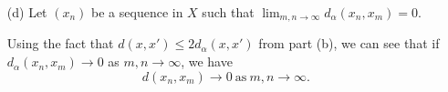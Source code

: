 \documentclass[a4paper]{article}
\begin{document}
\begin{enumerate}
        \( \lim_{ m,n \to \infty  }  {d}_{\alpha}({x}_{n}, {x}_{m}) = 0  \).
        \begin{proof}
        We claim that \( \lim_{ m,n  \to \infty  }  {d}_{\alpha}({x}_{n}, {x}_{m}) = 0  \) holds given \( \lim_{ m,n \to \infty  } d({x}_{n},{x}_{m}) = 0  \). Indeed, using the Algebraic Limit Theorem, we have
        \begin{align*}
            \lim_{ m,n  \to  \infty   }  {d}_{\alpha}({x}_{n}, {x}_{m}) &= \lim_{ m,n  \to  \infty   }  \Big[ \frac{ d({x}_{n}, {x}_{m}) }{  1 + \alpha d({x}_{n}, {x}_{m}) } \Big] \\
                                                                        &= \frac{ \lim_{ m,n \to  \to \infty  } d({x}_{n}, {x}_{m}) }{ 1 + \alpha \lim_{ m,n  \to \infty  }  d({x}_{n}, {x}_{m}) } \\
                                                                        &= \frac{  0  }{  1+ \alpha \cdot  0  }  \\
                                                                        &= 0.
        \end{align*}
        \end{proof}
    \item[(d)] Let \( ({x}_{n}) \) be a sequence in \( X  \) such that \( \lim_{ m,n  \to  \infty  }  {d}_{\alpha}({x}_{n}, {x}_{m}) = 0  \).
        \begin{solution}
        Using the fact that \( d(x,x') \leq 2 {d}_{\alpha}(x,x') \) from part (b), we can see that if \( {d}_{\alpha}({x}_{n}, {x}_{m}) \to 0   \) as \( m,n \to \infty   \), we have
        \[  d({x}_{n}, {x}_{m}) \to 0 \ \text{as} \ m,n \to \infty.  \]
        \end{solution}
\end{enumerate}
\end{document}
